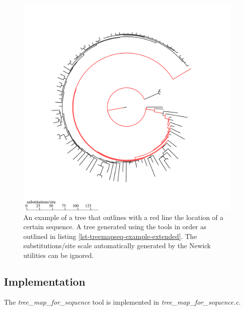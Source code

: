 \begin{figure}
  \includegraphics[scale=0.7]{tree-stroke.pdf}
  \caption{An example of a tree that outlines with a red line the
    location of a certain sequence. A tree generated using the tools in
    order as outlined in listing
    \ref{lst-treemapseq-example-extended}. The substitutions/site
    scale automatically generated by the Newick utilities
    \cite{newick_tools} can be ignored.}
  \label{fig-treemapseq}
\end{figure}

\subsection{Implementation}
The \emph{tree\_map\_for\_sequence} tool is implemented in \newline
\emph{tree\_map\_for\_sequence.c}.

